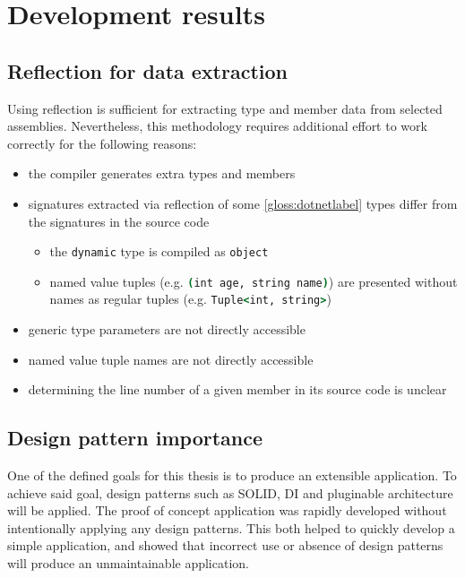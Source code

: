 \section{Development results}

\subsection{Reflection for data extraction}

Using reflection is sufficient for extracting type and member data from selected assemblies. Nevertheless, this methodology requires additional effort to work correctly for the following reasons:
\begin{itemize}
    \item the compiler generates extra types and members
    \item signatures extracted via reflection of some \ref{gloss:dotnetlabel} types differ from the signatures in the source code
    \begin{itemize}
        \item the \lstinline[language=csh]{dynamic} type is compiled as \lstinline[language=csh]{object}
        \item named value tuples (e.g. \lstinline[language=csh]{(int age, string name)}) are presented without names as regular tuples (e.g. \lstinline[language=csh]{Tuple<int, string>})
    \end{itemize}
    \item generic type parameters are not directly accessible
    \item named value tuple names are not directly accessible
    \item determining the line number of a given member in its source code is unclear
\end{itemize}

\subsection{Design pattern importance}

One of the defined goals for this thesis is to produce an extensible application. To achieve said goal, design patterns such as SOLID, DI and pluginable architecture will be applied.
The proof of concept application was rapidly developed without intentionally applying any design patterns. This both helped to quickly develop a simple application, and showed that incorrect use or absence of design patterns will produce an unmaintainable application.

